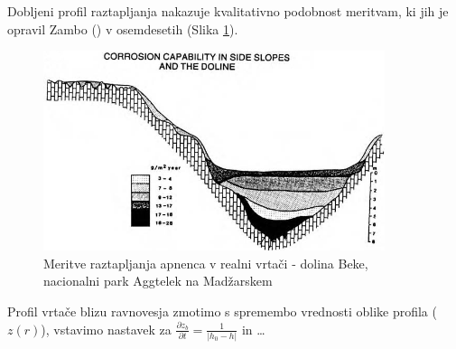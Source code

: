 \documentclass[a4paper, oneside, 12pt]{book}
\begin{document}
Dobljeni profil raztapljanja nakazuje kvalitativno podobnost meritvam, ki jih je opravil Zambo (\cite{Zambo1997}) v osemdesetih (Slika \ref{fig:vrtaca-aggtelek}).

\begin{figure}[H]
  \begin{center}
    \includegraphics[width=10cm]{slike/vrtaca-aggtelek}
  \end{center}
  \caption{Meritve raztapljanja apnenca v realni vrtači - dolina Beke, nacionalni park Aggtelek na Madžarskem \cite{Zambo1997}}
  \label{fig:vrtaca-aggtelek}
\end{figure}

Profil vrtače blizu ravnovesja zmotimo s spremembo vrednosti oblike profila ($z(r)$), vstavimo nastavek za $\frac{\partial z_b}{\partial t}=\frac{1}{|h_0-h|}$ in \dots
\end{document}

